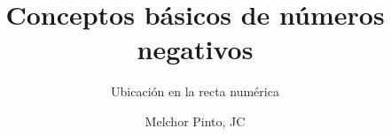 \documentclass{guia}
\title{Conceptos básicos de números negativos}
\subtitle{Ubicación en la recta numérica}
\author{Melchor Pinto, JC}
\begin{document}
%
\begin{questions}
\questionboxed{}
\end{questions}
\end{document}
